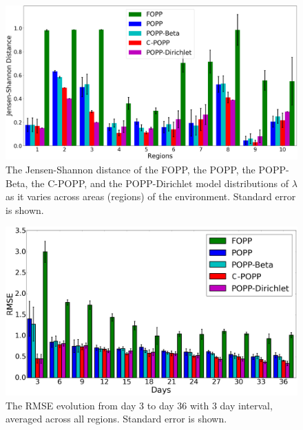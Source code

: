 \begin{figure}[t!]
	\centering
	\includegraphics[width=0.95\columnwidth]{./figures/fopp_popp_popb_npop_popd_homo_kl.png}
	\caption{The Jensen-Shannon distance of the FOPP, the POPP, the POPP-Beta, the C-POPP, and the POPP-Dirichlet model distributions of $\lambda$ as it varies across areas (regions) of the environment. Standard error is shown.}
	\label{fig:fopp_popp_popb_npop_popd_homo_kl}
\end{figure}

\begin{figure}[t!]
	\centering
	\includegraphics[width=0.95\columnwidth]{./figures/rmse_evolution_popp_dirichlet.png}
	\caption{The RMSE evolution from day 3 to day 36 with 3 day interval, averaged across all regions. Standard error is shown.}
	\label{fig:rmse_evolution_popp_dirichlet}
\end{figure}

